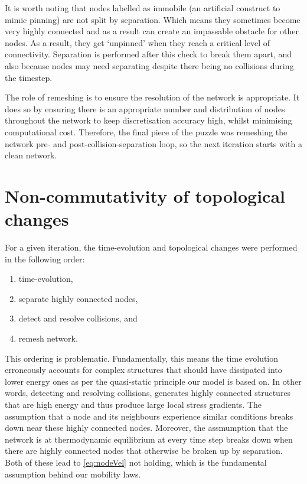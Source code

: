 It is worth noting that nodes labelled as immobile (an artificial construct to mimic pinning) are not split by separation. Which means they sometimes become very highly connected and as a result can create an impassable obstacle for other nodes. As a result, they get `unpinned' when they reach a critical level of connectivity. Separation is performed after this check to break them apart, and also because nodes may need separating despite there being no collisions during the timestep.

The role of remeshing is to ensure the resolution of the network is appropriate. It does so by ensuring there is an appropriate number and distribution of nodes throughout the network to keep discretisation accuracy high, whilst minimising computational cost. Therefore, the final piece of the puzzle was remeshing the network pre- and post-collision-separation loop, so the next iteration starts with a clean network.

\section{Non-commutativity of topological changes}\label{s:nonCommutativity}

For a given iteration, the time-evolution and topological changes were performed in the following order:
\begin{enumerate}
    \item time-evolution,
    \item separate highly connected nodes,
    \item detect and resolve collisions, and
    \item remesh network.
\end{enumerate}
This ordering is problematic. Fundamentally, this means the time evolution erroneously accounts for complex structures that should have dissipated into lower energy ones as per the quasi-static principle our model is based on. In other words, detecting and resolving collisions, generates highly connected structures that are high energy and thus produce large local stress gradients. The assumption that a node and its neighbours experience similar conditions breaks down near these highly connected nodes. Moreover, the assmumption that the network is at thermodynamic equilibrium at every time step breaks down when there are highly connected nodes that otherwise be broken up by separation. Both of these lead to \cref{eq:nodeVel} not holding, which is the fundamental assumption behind our mobility laws.


